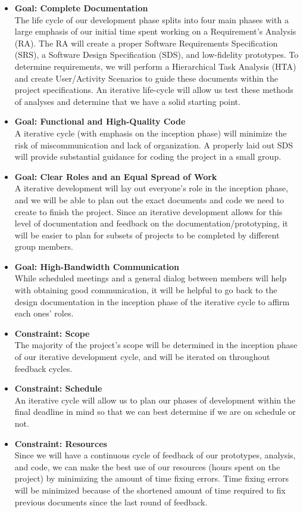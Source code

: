 \documentclass[a4paper, 11pt]{article}
\begin{document}
\begin{itemize}
	\item \textbf{Goal: Complete Documentation} \\
     The life cycle of our development phase splits into four main phases with a large emphasis of our initial time spent working on a Requirement’s Analysis (RA). The RA will create a proper Software Requirements Specification (SRS), a Software Design Specification (SDS), and low-fidelity prototypes. To determine requirements, we will perform a Hierarchical Task Analysis (HTA) and create User/Activity Scenarios to guide these documents within the project specifications. An iterative life-cycle will allow us test these methods of analyses and determine that we have a solid starting point.
	
	\item \textbf{Goal: Functional and High-Quality Code} \\
	A iterative cycle (with emphasis on the inception phase) will minimize the risk of miscommunication and lack of organization. A properly laid out SDS will provide substantial guidance for coding the project in a small group.
	
	\item \textbf{Goal: Clear Roles and an Equal Spread of Work} \\
	 A iterative development will lay out everyone's role in the inception phase, and we will be able to plan out the exact documents and code we need to create to finish the project. Since an iterative development allows for this level of documentation and feedback on the documentation/prototyping, it will be easier to plan for subsets of projects to be completed by different group members.
	
	\item \textbf{Goal: High-Bandwidth Communication} \\
	While scheduled meetings and a general dialog between members will help with obtaining good communication, it will be helpful to go back to the design documentation in the inception phase of the iterative cycle to affirm each ones' roles.
	
	\item \textbf{Constraint: Scope} \\ The majority of the project's scope will be determined in the inception phase of our iterative development cycle, and will be iterated on throughout feedback cycles.
	\item \textbf{Constraint: Schedule} \\ An iterative cycle will allow us to plan our phases of development within the final deadline in mind so that we can best determine if we are on schedule or not. 
	\item \textbf{Constraint: Resources} \\ Since we will have a continuous cycle of feedback of our prototypes, analysis, and code, we can make the best use of our resources (hours spent on the project) by minimizing the amount of time fixing errors. Time fixing errors will be minimized because of the shortened amount of time required to fix previous documents since the last round of feedback.
		
\end{itemize}
\end{document}
